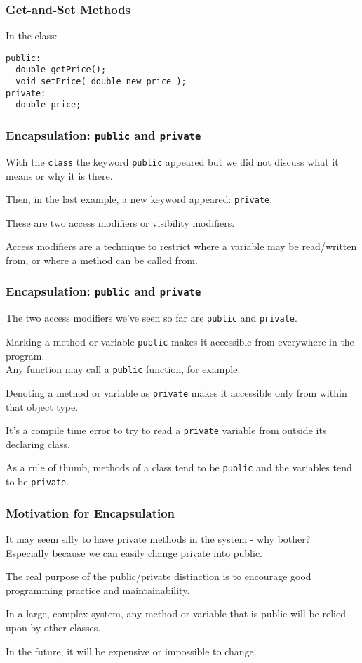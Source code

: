 \begin{frame}[fragile]
\frametitle{Get-and-Set Methods}

In the class:
\begin{verbatim}
public: 
  double getPrice();
  void setPrice( double new_price );
private:
  double price;
\end{verbatim}

\end{frame}




\begin{frame}
\frametitle{Encapsulation: \texttt{public} and \texttt{private}}

With the \texttt{class} the keyword \texttt{public} appeared but we did not discuss what it means or why it is there.

Then, in the last example, a new keyword appeared: \texttt{private}.

These are two \alert{access modifiers} or \alert{visibility modifiers}.

Access modifiers are a technique to restrict where a variable may be read/written from, or where a method can be called from.

\end{frame}

\begin{frame}
\frametitle{Encapsulation: \texttt{public} and \texttt{private}}

The two access modifiers we've seen so far are \texttt{public} and \texttt{private}.

Marking a method or variable \texttt{public} makes it accessible from everywhere in the program. \\
\quad Any function may call a \texttt{public} function, for example.

Denoting a method or variable as \texttt{private} makes it accessible only from within that object type.

It's a compile time error to try to read a \texttt{private} variable from outside its declaring class.

As a rule of thumb, methods of a class tend to be \texttt{public} and the variables tend to be \texttt{private}.

\end{frame}

\begin{frame}
\frametitle{Motivation for Encapsulation}
It may seem silly to have private methods in the system - why bother?\\
\quad Especially because we can easily change private into public.

The real purpose of the public/private distinction is to encourage good programming practice and maintainability.

In a large, complex system, any method or variable that is public will be relied upon by other classes.

In the future, it will be expensive or impossible to change.

\end{frame}

